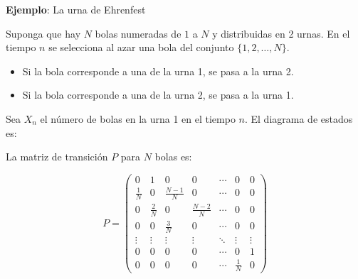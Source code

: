 \documentclass[12pt,a4paper]{article}
\begin{document}
\textbf{Ejemplo}: La urna de Ehrenfest

Suponga que hay $N$ bolas numeradas de $1$ a $N$ y distribuidas en 2 urnas.  
En el tiempo $n$ se selecciona al azar una bola del conjunto $\{1, 2, \ldots, N\}$.

\begin{itemize}
    \item Si la bola corresponde a una de la urna 1, se pasa a la urna 2.
    \item Si la bola corresponde a una de la urna 2, se pasa a la urna 1.
\end{itemize}

Sea $X_n$ el número de bolas en la urna 1 en el tiempo $n$.  
El diagrama de estados es:

\begin{center}
\end{center}

La matriz de transición $P$ para $N$ bolas es:

\begin{equation*}
P =
\begin{pmatrix}
0 & 1 & 0 & 0 & \cdots & 0 & 0 \\
\frac{1}{N} & 0 & \frac{N-1}{N} & 0 & \cdots & 0 & 0 \\
0 & \frac{2}{N} & 0 & \frac{N-2}{N} & \cdots & 0 & 0 \\
0 & 0 & \frac{3}{N} & 0 & \cdots & 0 & 0 \\
\vdots & \vdots & \vdots & \vdots & \ddots & \vdots & \vdots \\
0 & 0 & 0 & 0 & \cdots & 0 & 1 \\
0 & 0 & 0 & 0 & \cdots & \frac{1}{N} & 0
\end{pmatrix}
\end{equation*}
\end{document}
